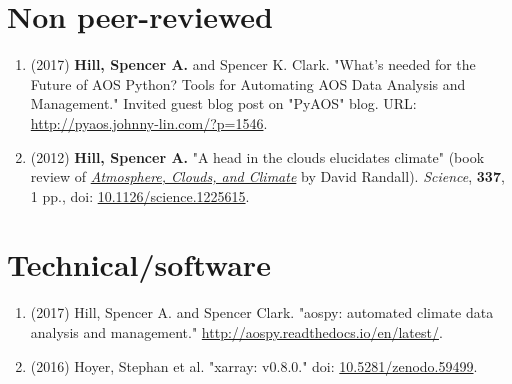 \documentclass[12pt,letterpaper]{shillcv}
\begin{document}
\section*{Non peer-reviewed}
\label{sec:org49e19d9}
\begin{enumerate}
\item (2017) \textbf{Hill, Spencer A.} and Spencer K. Clark.  "What’s needed for the Future
of AOS Python? Tools for Automating AOS Data Analysis and Management."
Invited guest blog post on "PyAOS" blog.  URL:
\url{http://pyaos.johnny-lin.com/?p=1546}.
\item (2012) \textbf{Hill, Spencer A.}  "A head in the clouds elucidates climate" (book
review of \href{http://press.princeton.edu/titles/9773.html}{\emph{Atmosphere, Clouds, and Climate}} by David Randall). \emph{Science}, \textbf{337},
1 pp., doi: \href{http://dx.doi.org/10.1126/science.1225615}{10.1126/science.1225615}.
\end{enumerate}
\section*{Technical/software}
\label{sec:orge9d9082}
\begin{enumerate}
\item (2017) Hill, Spencer A. and Spencer Clark.  "aospy: automated climate data
analysis and management."  \url{http://aospy.readthedocs.io/en/latest/}.
\item (2016) Hoyer, Stephan et al.  "xarray: v0.8.0."  doi: \href{https://doi.org/10.5281/zenodo.59499}{10.5281/zenodo.59499}.
\end{enumerate}
\end{document}
